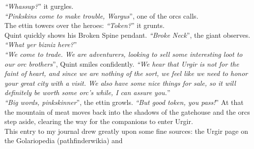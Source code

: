 {\itshape``Whassup?}'' it gurgles.\\

{\itshape``Pinkskins come to make trouble, Wargus}'', one of the orcs calls.\\

The ettin towers over the heroes: {\itshape``Token?}'' it grunts.\\

Quint quickly shows his Broken Spine pendant. {\itshape``Broke Neck}'', the giant observes. {\itshape``What yer bizniz here?}''\\

{\itshape``We come to trade. We are adventurers, looking to sell some interesting loot to our orc brothers}'', Quint smiles confidently. {\itshape``We hear that Urgir is not for the faint of heart, and since we are nothing of the sort, we feel like we need to honor your great city with a visit. We also have some nice things for sale, so it will definitely be worth some orc's while, I can assure you.}''\\

{\itshape``Big words, pinkskinner}'', the ettin growls. {\itshape``But good token, you pass!}'' At that the mountain of meat moves back into the shadows of the gatehouse and the orcs step aside, clearing the way for the companions to enter Urgir.\\

This entry to my journal drew greatly upon some fine sources: the Urgir page on the Golariopedia (pathfinderwikia) and 